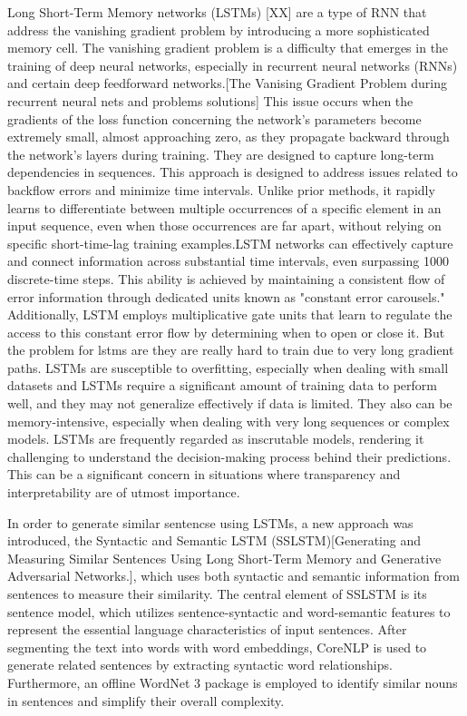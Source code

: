 \documentclass[conference]{IEEEtran}
\begin{document}
 Long Short-Term Memory networks (LSTMs) [XX] are a type of RNN that address the vanishing gradient problem by introducing a more sophisticated memory cell. The vanishing gradient problem is a difficulty that emerges in the training of deep neural networks, especially in recurrent neural networks (RNNs) and certain deep feedforward networks.[The Vanising Gradient Problem during recurrent neural nets and problems solutions] This issue occurs when the gradients of the loss function concerning the network's parameters become extremely small, almost approaching zero, as they propagate backward through the network's layers during training.
 They are designed to capture long-term dependencies in sequences. This approach is designed to address issues related to backflow errors and minimize time intervals. Unlike prior methods, it rapidly learns to differentiate between multiple occurrences of a specific element in an input sequence, even when those occurrences are far apart, without relying on specific short-time-lag training examples.LSTM networks can effectively capture and connect information across substantial time intervals, even surpassing 1000 discrete-time steps. This ability is achieved by maintaining a consistent flow of error information through dedicated units known as "constant error carousels." Additionally, LSTM employs multiplicative gate units that learn to regulate the access to this constant error flow by determining when to open or close it. 
But the problem for lstms are they are really hard to train due to very long gradient paths. LSTMs are susceptible to overfitting, especially when dealing with small datasets and LSTMs require a significant amount of training data to perform well, and they may not generalize effectively if data is limited. They also can be memory-intensive, especially when dealing with very long sequences or complex models. LSTMs are frequently regarded as inscrutable models, rendering it challenging to understand the decision-making process behind their predictions. This can be a significant concern in situations where transparency and interpretability are of utmost importance.

In order to generate similar sentencse using LSTMs, a new approach was introduced, the Syntactic and Semantic LSTM (SSLSTM)[Generating and Measuring Similar Sentences Using Long Short-Term Memory and Generative Adversarial Networks.], which uses both syntactic and semantic information from sentences to measure their similarity. The central element of SSLSTM is its sentence model, which utilizes sentence-syntactic and word-semantic features to represent the essential language characteristics of input sentences. After segmenting the text into words with word embeddings, CoreNLP is used to generate related sentences by extracting syntactic word relationships. Furthermore, an offline WordNet 3 package is employed to identify similar nouns in sentences and simplify their overall complexity.
\end{document}
